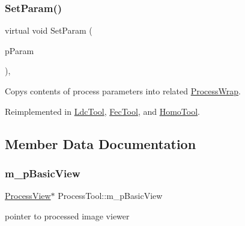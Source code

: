 \mbox{\label{class_process_tool_a50caa175198cece00b39a146715bf3eb}} 
\subsubsection{\texorpdfstring{Set\+Param()}{SetParam()}}
{\footnotesize\ttfamily virtual void Set\+Param (\begin{DoxyParamCaption}\item[{\mbox{\hyperlink{class_process_wrap}{Process\+Wrap}} $\ast$}]{p\+Param }\end{DoxyParamCaption})\hspace{0.3cm}{\ttfamily [inline]}, {\ttfamily [virtual]}}

Copys contents of process parameters into related \mbox{\hyperlink{class_process_wrap}{Process\+Wrap}}. 

Reimplemented in \mbox{\hyperlink{class_ldc_tool_a1c98303e0ab2dfea1f1dcca8f1548307}{Ldc\+Tool}}, \mbox{\hyperlink{class_fec_tool_acd6cd4230cb79fe0cb1053c588f91806}{Fec\+Tool}}, and \mbox{\hyperlink{class_homo_tool_a69965855ba23da88abe7903ad58c20c6}{Homo\+Tool}}.



\subsection{Member Data Documentation}
\mbox{\label{class_process_tool_a775ff126073fabb52a8374c083058596}} 
\subsubsection{\texorpdfstring{m\+\_\+p\+Basic\+View}{m\_pBasicView}}
{\footnotesize\ttfamily \mbox{\hyperlink{class_process_view}{Process\+View}}$\ast$ Process\+Tool\+::m\+\_\+p\+Basic\+View\hspace{0.3cm}{\ttfamily [protected]}}

pointer to processed image viewer \mbox{\label{class_process_tool_ae19c0d700f0a30bb0ca9d18e5397a562}} 
